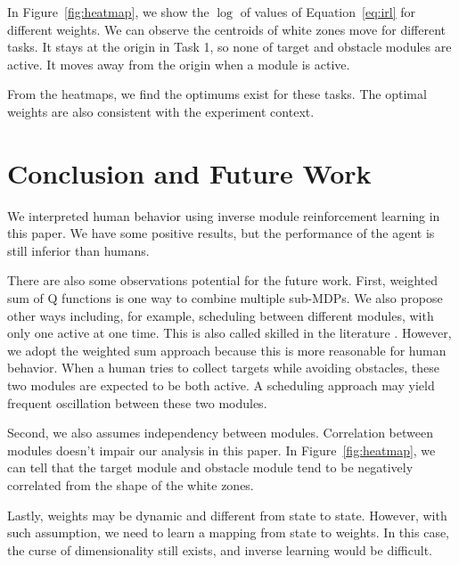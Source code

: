 \documentclass[11pt]{article} %
\begin{document}
In Figure~\ref{fig:heatmap}, we show the $\log$ of values of Equation~\ref{eq:irl} for
different weights. We can observe the centroids of white zones move for different
tasks. It stays at the origin in Task 1, so none of target and obstacle modules
are active. It moves away from the origin when a module is active.

From the heatmaps, we find the optimums exist for these tasks. The optimal
weights are also consistent with the experiment context.

\section{Conclusion and Future Work}
\label{sec:conclude}

We interpreted human behavior using inverse module reinforcement learning in
this paper. We have some positive results, but the performance of the agent is
still inferior than humans.

There are also some observations potential for the future work. First, 
weighted sum of Q functions is one way to combine multiple sub-MDPs. We also
propose other ways including, for example, scheduling between different modules,
with only one active at one time. This is also called skilled in the literature
\cite{konidaris2009skill}. However, we adopt the weighted sum approach
because this is more reasonable for human behavior. When a human tries to collect
targets while avoiding obstacles, these two modules are expected to be both
active. A scheduling approach may yield frequent oscillation between these two
modules.

Second, we also assumes independency between modules. Correlation between
modules doesn't impair our analysis in this paper. In Figure~\ref{fig:heatmap},
we can tell that the target module and obstacle module tend to be negatively
correlated from the shape of the white zones.

Lastly, weights may be dynamic and different from state to state. However, with
such assumption, we need to learn a mapping from state to weights. In this case,
the curse of dimensionality still exists, and inverse learning would be
difficult.



\end{document}
